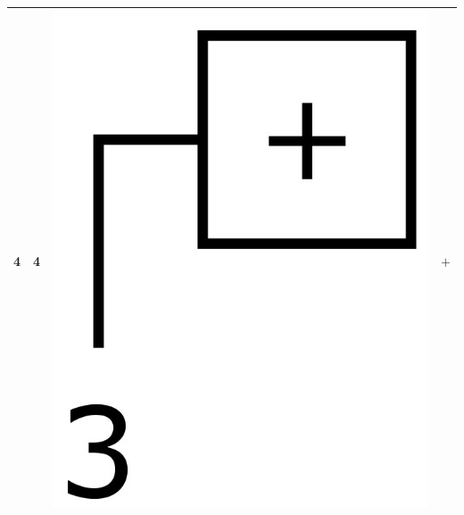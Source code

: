 \documentclass[12pt, a4paper]{report}
\begin{document}
\begin{center}
\begin{tabular}{ |l|l|c|c| }
	4 & 4 & \includegraphics[trim=0 -2 0 -2,height=0.06\textheight]{assets/expr0.jpg} & $+$ \\ 
	\hline

\end{tabular}
\end{center}
\end{document}
